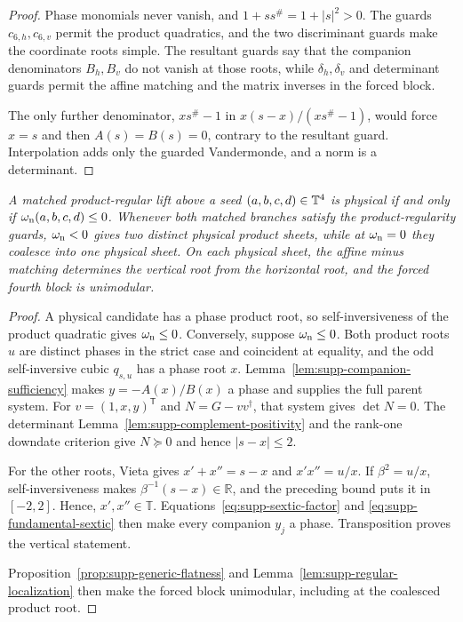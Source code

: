 \begin{proof}
Phase monomials never vanish, and $1+ss^\#=1+|s|^2>0$. The guards $c_{6,h},c_{6,v}$ permit the product quadratics, and the two discriminant guards make the coordinate roots simple. The resultant guards say that the companion denominators $B_h,B_v$ do not vanish at those roots, while $\delta_h,\delta_v$ and determinant guards permit the affine matching and the matrix inverses in the forced block.

{The only further denominator, $xs^\#-1$ in $x(s-x)/(xs^\#-1)$, would force $x=s$ and then $A(s)=B(s)=0$, contrary to the resultant guard.  Interpolation adds only the guarded Vandermonde, and a norm is a determinant.}
\end{proof}

{\emph{A matched product-regular lift above a seed $(a,b,c,d)\in\mathbb T^4$ is physical if and only if $\omega_{\rm n}(a,b,c,d)\leq0$. Whenever both matched branches satisfy the product-regularity guards, $\omega_{\rm n}<0$ gives two distinct physical product sheets, while at $\omega_{\rm n}=0$ they coalesce into one physical sheet. On each physical sheet, the affine minus matching determines the vertical root from the horizontal root, and the forced fourth block is unimodular.}}

\begin{proof}
A physical candidate has a phase product root, so self-inversiveness of the product quadratic gives $\omega_{\rm n}\leq0$.  Conversely, suppose $\omega_{\rm n}\leq0$. Both product roots $u$ are distinct phases in the strict case and coincident at equality, and the odd self-inversive cubic $q_{s,u}$ has a phase root $x$.  {Lemma~\ref{lem:supp-companion-sufficiency} makes $y=-A(x)/B(x)$ a phase and supplies the full parent system.  For $v=(1,x,y)^{\mathsf T}$ and $N=G-vv^\dagger$, that system gives $\det N=0$. The determinant Lemma~\ref{lem:supp-complement-positivity} and the rank-one downdate criterion give $N\succeq0$ and hence $|s-x|\le2$.}

{For the other roots, Vieta gives $x'+x''=s-x$ and $x'x''=u/x$.  If $\beta^2=u/x$, self-inversiveness makes $\beta^{-1}(s-x)\in\mathbb R$, and the preceding bound puts it in $[-2,2]$. Hence, $x',x''\in\mathbb T$.  Equations~\eqref{eq:supp-sextic-factor} and \eqref{eq:supp-fundamental-sextic} then make every companion $y_j$ a phase. Transposition proves the vertical statement.}

{Proposition~\ref{prop:supp-generic-flatness} and Lemma~\ref{lem:supp-regular-localization} then make the forced block unimodular, including at the coalesced product root.}
\end{proof}

